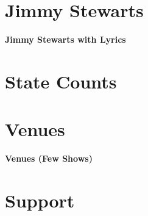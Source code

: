\documentclass[8pt]{book}
\makeatletter
\let\mcnewpage=\newpage
\newcommand{\TrickSupertabularIntoMulticols}{
\renewcommand\newpage{
    \if@firstcolumn
        \hrule width\linewidth height0pt
            \columnbreak
        \else
          \mcnewpage
        \fi
}}
\makeatother
\begin{document}
\chapter{Jimmy Stewarts}

\begin{multicols*}{3}
\TrickSupertabularIntoMulticols

\begin{center}\Large{\textbf{Jimmy Stewarts with Lyrics}}\end{center}

\end{multicols*}

\chapter{State Counts}

\setlength{\tabcolsep}{5pt}
\begin{multicols*}{2}
\TrickSupertabularIntoMulticols

\end{multicols*}

\chapter{Venues}

\begin{multicols*}{3}
\TrickSupertabularIntoMulticols
\noindent

\end{multicols*}
\newpage
\begin{Large}\noindent\textbf{Venues (Few Shows)}\end{Large}


\chapter{Support}

\begin{multicols*}{3}
\TrickSupertabularIntoMulticols
\noindent

\end{multicols*}
\end{document}
